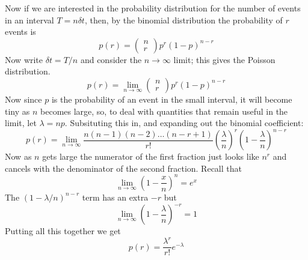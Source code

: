 \documentclass[11pt,a4paper]{scrartcl}
\begin{document}
Now if we are interested in the probability distribution for the number of events in an interval $T=n\delta t$, then, by the binomial distribution the probability of $r$ events is
\begin{equation}
p(r)=\left(\begin{array}{c}n\\r\end{array}\right)p^r(1-p)^{n-r}
\end{equation}
Now write $\delta t=T/n$ and consider the $n\rightarrow \infty$ limit;
this gives the Poisson distribution. 
\begin{equation}
p(r)=\lim_{n\rightarrow\infty}\left(\begin{array}{c}n\\r\end{array}\right)p^r(1-p)^{n-r}
\end{equation}
Now since $p$ is the probability of an event in the small interval, it will become tiny as $n$ becomes large, so, to deal with quantities that remain useful in the limit, let $\lambda=np$. Subsituting this in, and expanding out the binomial coefficient:
\begin{equation}
p(r)=\lim_{n\rightarrow\infty}\frac{n(n-1)(n-2)\ldots (n-r+1)}{r!}\left(\frac{\lambda}{n}\right)^r\left(1-\frac{\lambda}{n}\right)^{n-r}
\end{equation}
Now as $n$ gets large the numerator of the first fraction just looks like $n^r$ and cancels with the denominator of the second fraction. Recall that
\begin{equation}
\lim_{n\rightarrow \infty}\left(1-\frac{x}{n}\right)^n=e^x
\end{equation}
The $(1-\lambda/n)^{n-r}$ term has an extra $-r$ but
\begin{equation}
\lim_{n\rightarrow \infty}\left(1-\frac{\lambda}{n}\right)^{-r}=1
\end{equation}
Putting all this together we get
\begin{equation}
p(r)=\frac{\lambda^r}{r!}e^{-\lambda}
\end{equation}
\end{document}
